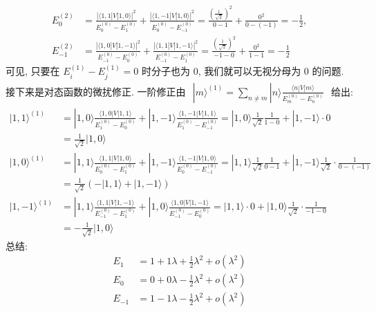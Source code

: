 \documentclass[../../main.tex]{subfiles}
\begin{document}
\begin{enumerate}
\begin{enumerate}
{{\begin{align*}
      E_{0}^{(2)} &= \frac{|\langle 1,1|V|1,0\rangle|^{2}}{E_{0}^{(0)} - E_{1}^{(0)}} + \frac{|\langle 1,-1|V|1,0\rangle|^{2}}{E_{0}^{(0)} - E_{-1}^{(0)}} = \frac{\left(\frac{1}{\sqrt{2}}\right)^{2}}{0-1} + \frac{0^{2}}{0 - (-1)} = \boxed{-\frac{1}{2}},\\
      E_{-1}^{(2)} &= \frac{|\langle 1,0|V|1,-1\rangle|^{2}}{E_{-1}^{(0)} - E_{0}^{(0)}} + \frac{|\langle 1,1|V|1,-1\rangle|^{2}}{E_{-1}^{(0)} - E_{1}^{(0)}} = \frac{\left(\frac{1}{\sqrt{2}}\right)^{2}}{-1-0} + \frac{0^{2}}{1 - 1} = \boxed{-\frac{1}{2}}
    \end{align*}
    可见, 只要在 $E_{i}^{(1)} - E_{j}^{(1)}=0$ 时分子也为 $0$, 我们就可以无视分母为 $0$ 的问题. 
    接下来是对态函数的微扰修正. 一阶修正由 $\begin{aligned}
      |m\rangle^{(1)} = \sum_{n\neq m}|n\rangle\frac{\langle n|V|m\rangle}{E_{m}^{(0)} - E_{n}^{(0)}}
    \end{aligned}$ 给出:
    \begin{align*}
      |1,1\rangle^{(1)} &= |1,0\rangle\frac{\langle 1,0|V|1,1\rangle}{E_{1}^{(0)} - E_{0}^{(0)}} + |1,-1\rangle\frac{\langle 1,-1|V|1,1\rangle}{E_{1}^{(0)} - E_{-1}^{(0)}} = |1,0\rangle\frac{1}{\sqrt{2}}\frac{1}{1 - 0} + |1,-1\rangle\cdot 0 \\
      &= \boxed{\frac{1}{\sqrt{2}}|1,0\rangle}\\
      |1,0\rangle^{(1)} &= |1,1\rangle\frac{\langle 1,1|V|1,0\rangle}{E_{0}^{(0)} - E_{1}^{(0)}} + |1,-1\rangle\frac{\langle 1,-1|V|1,0\rangle}{E_{0}^{(0)} - E_{-1}^{(0)}} = |1,1\rangle \frac{1}{\sqrt{2}}\frac{1}{0-1} + |1,-1\rangle \frac{1}{\sqrt{2}}\cdot\frac{1}{0-(-1)} \\
      &= \boxed{\frac{1}{\sqrt{2}}(-|1,1\rangle + |1,-1\rangle)}\\
      |1,-1\rangle^{(1)} &= |1,1\rangle\frac{\langle 1,1|V|1,-1\rangle}{E_{-1}^{(0)}-E_{1}^{(0)}} + |1,0\rangle\frac{\langle 1,0|V|1,-1\rangle}{E_{-1}^{(0)}-E_{0}^{(0)}} = |1,1\rangle\cdot 0 + |1,0\rangle\frac{1}{\sqrt{2}}\cdot\frac{1}{-1-0} \\
      &= \boxed{-\frac{1}{\sqrt{2}}|1,0\rangle}
    \end{align*}
    总结:
    \begin{align*}
      E_{1} & = 1 + 1\lambda + \frac{1}{2}\lambda^{2} + \mathit{o}(\lambda^{2})\\
      E_{0} & = 0 + 0\lambda - \frac{1}{2}\lambda^{2} +  \mathit{o}(\lambda^{2})\\
      E_{-1} &= 1 - 1\lambda - \frac{1}{2}\lambda^{2} + \mathit{o}(\lambda^{2})\\

\end{align*}}}
\end{enumerate}
\end{enumerate}
\end{document}

